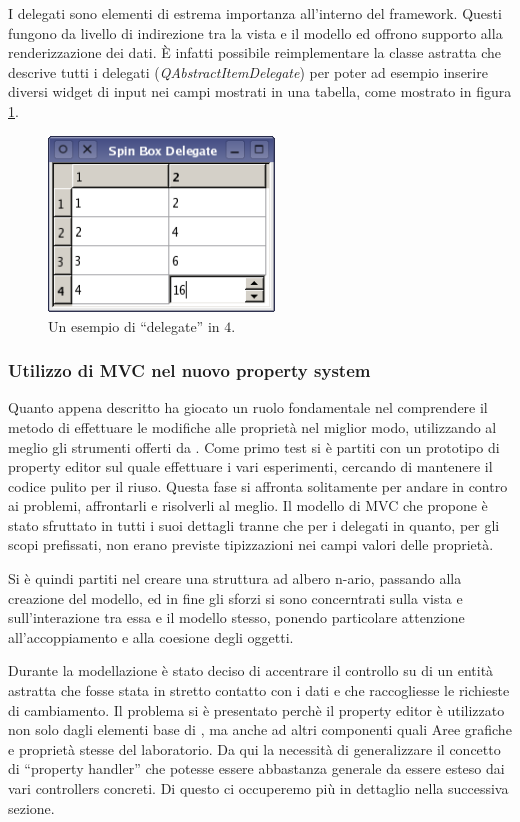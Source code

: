I delegati sono elementi di estrema importanza all'interno del framework. Questi fungono da livello di indirezione tra la vista e il modello ed offrono supporto alla renderizzazione dei dati. È infatti possibile reimplementare la classe astratta che descrive tutti i delegati (\emph{QAbstractItemDelegate}) per poter ad esempio inserire diversi widget di input nei campi mostrati in una tabella, come mostrato in figura \ref{figura:qt_delegate}.

\begin{figure}[!htb]
	\centering
	\includegraphics[width=6cm]{images/spinboxdelegate-example.png}
	\caption{Un esempio di ``delegate'' in \qt{}$4$.}
	\label{figura:qt_delegate}
\end{figure}

\subsubsection*{Utilizzo di MVC nel nuovo property system}
Quanto appena descritto ha giocato un ruolo fondamentale nel comprendere il metodo di effettuare le modifiche alle proprietà nel miglior modo, utilizzando al meglio gli strumenti offerti da \qt{}. Come primo test si è partiti con un prototipo di property editor sul quale effettuare i vari esperimenti, cercando di mantenere il codice pulito per il riuso.
Questa fase si affronta solitamente per andare in contro ai problemi, affrontarli e risolverli al meglio. Il modello di MVC che \qt{} propone è stato sfruttato in tutti i suoi dettagli tranne che per i delegati in quanto, per gli scopi prefissati, non erano previste tipizzazioni nei campi valori delle proprietà.

Si è quindi partiti nel creare una struttura ad albero n-ario, passando alla creazione del modello, ed in fine gli sforzi si sono concerntrati sulla vista e sull'interazione tra essa e il modello stesso, ponendo particolare attenzione all'accoppiamento e alla coesione degli oggetti.

Durante la modellazione è stato deciso di accentrare il controllo su di un entità astratta che fosse stata in stretto contatto con i dati e che raccogliesse le richieste di cambiamento. Il problema si è presentato perchè il property editor è utilizzato non solo dagli elementi base di \visualnetkit{}, ma anche ad altri componenti quali Aree grafiche e proprietà stesse del laboratorio. Da qui la necessità di generalizzare il concetto di ``property handler'' che potesse essere abbastanza generale da essere esteso dai vari controllers concreti. Di questo ci occuperemo più in dettaglio nella successiva sezione.

